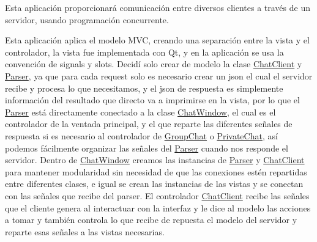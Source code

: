 

Esta aplicación proporcionará comunicación entre diversos clientes a través de un servidor, usando programación concurrente.


Esta aplicación aplica el modelo MVC, creando una separación entre la vista y el controlador, la vista fue implementada con Qt, y en la aplicación se usa la convención de signals y slots. Decidí solo crear de modelo la clase \mbox{\hyperlink{class_chat_client}{Chat\+Client}} y \mbox{\hyperlink{class_parser}{Parser}}, ya que para cada request solo es necesario crear un json el cual el servidor recibe y procesa lo que necesitamos, y el json de respuesta es simplemente información del resultado que directo va a imprimirse en la vista, por lo que el \mbox{\hyperlink{class_parser}{Parser}} está directamente conectado a la clase \mbox{\hyperlink{class_chat_window}{Chat\+Window}}, el cual es el controlador de la ventada principal, y el que reparte las diferentes señales de respuesta si es necesario al controlador de \mbox{\hyperlink{class_group_chat}{Group\+Chat}} o \mbox{\hyperlink{class_private_chat}{Private\+Chat}}, así podemos fácilmente organizar las señales del \mbox{\hyperlink{class_parser}{Parser}} cuando nos responde el servidor. Dentro de \mbox{\hyperlink{class_chat_window}{Chat\+Window}} creamos las instancias de \mbox{\hyperlink{class_parser}{Parser}} y \mbox{\hyperlink{class_chat_client}{Chat\+Client}} para mantener modularidad sin necesidad de que las conexiones estén repartidas entre diferentes clases, e igual se crean las instancias de las vistas y se conectan con las señales que recibe del parser. El controlador \mbox{\hyperlink{class_chat_client}{Chat\+Client}} recibe las señales que el cliente genera al interactuar con la interfaz y le dice al modelo las acciones a tomar y también controla lo que recibe de repuesta el modelo del servidor y reparte esas señales a las vistas necesarias.

